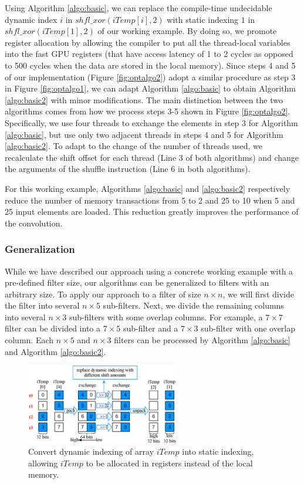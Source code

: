 Using Algorithm \ref{algo:basic}, we can replace the compile-time undecidable dynamic index $i$ in $shfl\_xor(iTemp[i],2)$ with static indexing $1$ in $shfl\_xor(iTemp[1],2)$ of our working example. 
By doing so, we promote register allocation by allowing the compiler to put all the thread-local variables into the fast GPU registers (that have access latency of 1 to 2 cycles as opposed to 500 cycles when the data are stored in the local memory). 
Since steps 4 and 5 of our implementation (Figure \ref{fig:optalgo2}) adopt a similar procedure as step 3 in Figure \ref{fig:optalgo1}, we can adapt Algorithm \ref{algo:basic} to obtain Algorithm \ref{algo:basic2} with minor modifications. 
The main distinction between the two algorithms comes from how we process steps 3-5 shown in Figure \ref{fig:optalgo2}.
Specifically, we use four threads to exchange the elements in step 3 for Algorithm \ref{algo:basic}, but use only two adjacent threads in steps 4 and 5 for Algorithm \ref{algo:basic2}. 
To adapt to the change of the number of threads used, we recalculate the shift offset for each thread (Line 3 of both algorithms) and change the arguments of the shuffle instruction (Line 6 in both algorithms).

For this working example, Algorithms \ref{algo:basic} and \ref{algo:basic2} respectively reduce the number of memory transactions from 5 to 2 and 25 to 10 when 5 and 25 input elements are loaded. 
This reduction greatly improves the performance of the convolution.

\subsubsection{Generalization} While we have described our approach using a concrete working example with a pre-defined filter size, our
algorithms can be generalized to filters with an arbitrary size. 
To apply our approach to a filter of size $n \times n$, we will first
divide the filter into several $n \times 5$ sub-filters. 
Next, we divide the remaining columns into several $n \times 3$ sub-filters with some overlap columns. 
For example, a $7 \times 7$ filter can be divided into a $7 \times 5$ sub-filter and a $7 \times 3$ sub-filter with one overlap column. 
Each $n \times 5$ and $n \times 3$ filters can be processed by Algorithm \ref{algo:basic} and Algorithm \ref{algo:basic2}.


\begin{figure}[t!]
	\centering
	\includegraphics[width=0.8\columnwidth,height=3.5cm]{./figure/exchange.eps}
\caption{Convert dynamic indexing of array $iTemp$ into static indexing, allowing  $iTemp$ to be allocated in registers instead of the local memory.}
\label{fig:exchange}
\end{figure}

